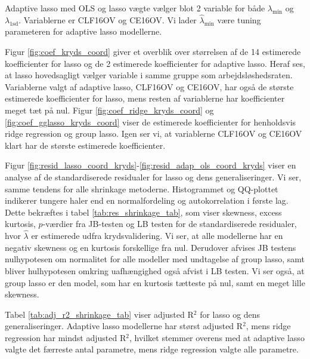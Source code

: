 Adaptive lasso med OLS og lasso vægte vælger blot 2 variable for både  $\lambda_{\min}$ og $\lambda_{1\text{sd}}$. 
Variablerne er  \textcolor{blue3}{CLF16OV} og \textcolor{blue3}{CE16OV}.
Vi lader $\widehat{\lambda}_{\min}$ være tuning parameteren for adaptive lasso modellerne. 

Figur \ref{fig:coef_kryds_coord} giver et overblik over størrelsen af de 14 estimerede koefficienter for lasso og de 2 estimerede koefficienter for adaptive lasso.
Heraf ses, at lasso hovedsagligt vælger variable i samme gruppe som arbejdsløshedsraten.
Variablerne valgt af adaptive lasso, \textcolor{blue3}{CLF16OV} og \textcolor{blue3}{CE16OV}, har også de største estimerede koefficienter for lasso, mens resten af variablerne har koefficienter meget tæt på nul. 
Figur \ref{fig:coef_ridge_kryds_coord} og \ref{fig:coef_gglasso_kryds_coord} viser de estimerede koefficienter for henholdsvis ridge regression og group lasso.
Igen ser vi, at variablerne \textcolor{blue3}{CLF16OV} og \textcolor{blue3}{CE16OV} klart har de største estimerede koefficienter.    
%


Figur \ref{fig:resid_lasso_coord_kryds}-\ref{fig:resid_adap_ols_coord_kryds} viser en analyse af de standardiserede residualer for lasso og dens generaliseringer. 
Vi ser, samme tendens for alle shrinkage metoderne. Histogrammet og QQ-plottet indikerer tungere haler end en normalfordeling og autokorrelation i første lag.
Dette bekræftes i tabel \ref{tab:res_shrinkage_tab}, som viser skewness, excess kurtosis, $p$-værdier fra JB-testen og LB testen for de standardiserede residualer, hvor $\widehat{\lambda}$ er estimerede udfra krydsvalidering.  
Vi ser, at alle modellerne har en negativ skewness og en kurtosis forskellige fra nul. 
Derudover afvises JB testens nulhypotesen om normalitet for alle modeller med undtagelse af group lasso, samt bliver hulhypotesen omkring uafhængighed også afvist i LB testen. 
Vi ser også, at group lasso er den model, som har en kurtosis tætteste på nul, samt en meget lille skewness. 


Tabel \ref{tab:adj_r2_shrinkage_tab} viser adjusted R$^2$ for lasso og dens generaliseringer.
Adaptive lasso modellerne har størst adjusted R$^2$, mens ridge regression har mindst adjusted R\(^2\), hvilket stemmer overens med at adaptive lasso valgte det færreste antal parametre, mens ridge regression valgte alle parametre. 


